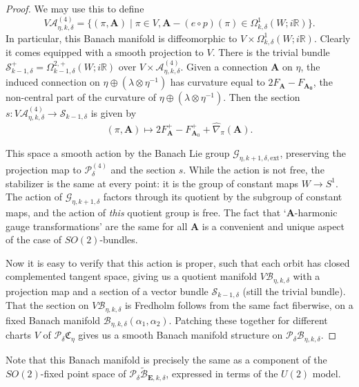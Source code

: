 \documentclass[10pt,a4paper]{amsart}
\theoremstyle{definition}
\theoremstyle{remark}
\numberwithin{figure}{qchap}
\begin{document}
\begin{proof}
We may use this to define $$V \mathcal A_{\eta,k,\delta}^{(4)} = \{(\pi, \mathbf{A}) \mid \pi \in V,  \mathbf{A} - (e\circ p)(\pi) \in \Omega^1_{k,\delta}(W;i\mathbb R)\}.$$ In particular, this Banach manifold is diffeomorphic to $V \times \Omega^1_{k,\delta}(W;i\mathbb R).$ Clearly it comes equipped with a smooth projection to $V$. There is the trivial bundle $\mathcal S_{k-1,\delta}^+ = \Omega^{2,+}_{k-1,\delta}(W;i\mathbb R)$ over $V \times \mathcal A_{\eta,k,\delta}^{(4)}.$ Given a connection $\mathbf{A}$ on $\eta$, the induced connection on $\eta \oplus (\lambda \otimes \eta^{-1})$ has curvature equal to $2F_{\mathbf{A}} - F_{\mathbf{A_0}}$, the non-central part of the curvature of $\eta \oplus (\lambda \otimes \eta^{-1})$. Then the section $s: V \mathcal A^{(4)}_{\eta, k, \delta} \to \mathcal S_{k-1, \delta}$ is given by $$(\pi, \mathbf{A}) \mapsto 2F_{\mathbf{A}}^+ - F_{\mathbf{A}_0}^+ + \widehat{\nabla}_\pi(\mathbf{A}).$$

This space a smooth action by the Banach Lie group $\mathcal G_{\eta, k+1,\delta,\text{ext}}$, preserving the projection map to $\mathcal P^{(4)}_{\delta}$ and the section $s$. While the action is not free, the stabilizer is the same at every point: it is the group of constant maps $W \to S^1$. The action of $\mathcal G_{\eta,k+1,\delta}$ factors through its quotient by the subgroup of constant maps, and the action of \emph{this} quotient group is free. The fact that `$\mathbf{A}$-harmonic gauge transformations' are the same for all $\mathbf{A}$ is a convenient and unique aspect of the case of $SO(2)$-bundles.

Now it is easy to verify that this action is proper, such that each orbit has closed complemented tangent space, giving us a quotient manifold $V \mathcal B_{\eta, k, \delta}$ with a projection map and a section of a vector bundle $\mathcal S_{k-1,\delta}$ (still the trivial bundle). That the section on $V \mathcal B_{\eta, k, \delta}$ is Fredholm follows from the same fact fiberwise, on a fixed Banach manifold $\mathcal B_{\eta, k, \delta}(\alpha_1, \alpha_2)$. Patching these together for different charts $V$ of $\mathcal P_{\delta} \mathfrak C_\eta$ gives us a smooth Banach manifold structure on $\mathcal P_{\delta} \mathcal B_{\eta, k, \delta}$.
\end{proof}

Note that this Banach manifold is precisely the same as a component of the $SO(2)$-fixed point space of $\mathcal P_{\delta} \widetilde{\mathcal B}_{\mathbf{E},k,\delta}$, expressed in terms of the $U(2)$ model.
\end{document}
